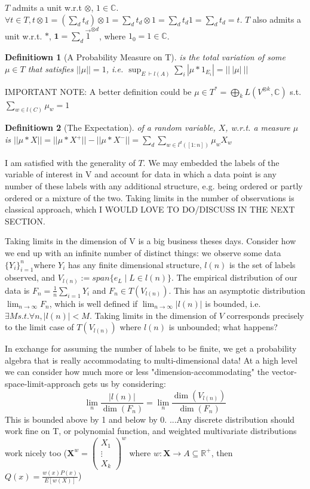 \documentclass{article}
\newtheorem*{definition}{Definitiown}
\begin{document}
$T$ admits a unit w.r.t $\otimes$, $1\in \mathbb{C}$. $\forall t \in T, t\otimes 1 = (\sum_d t_d)\otimes 1 = \sum_d t_d\otimes 1 = \sum_d t_d1 = \sum_d t_d = t$. 
$T$ also admits a unit w.r.t. $*$, $\mathbf{1} = \sum_d \vec{1}^{\otimes d}$, where $1_0 = 1\in\mathbb{C}$.

\begin{definition}[A Probability Measure on T] is the total variation of some $\mu\in T$ that satisfies $||\mu|| = 1 $, i.e. $\sup_{E\: \vdash l(A)} \sum_i |\mu * 1_{E_i}| =||\:|\mu|\: ||$ \end{definition} 

IMPORTANT NOTE: A better definition could be $\mu\in T^* = \bigoplus_k L(V^{\otimes k},\mathbb{C}) $ s.t. $\sum_{w\in l(C)}\mu_w = 1$

\begin{definition}[The Expectation] of a random variable, $X$, w.r.t. a measure $\mu$ is $  ||\mu *X ||= ||\mu* X^+||- ||\mu* X^-|| = \sum_d \sum_{w\in l^d([1:n])} \mu_w X_w$  \end{definition}

I am satisfied with the generality of $T$. We may embedded the labels of the variable of interest in V and account for data in which a data point is any number of these labels with any additional structure, e.g. being ordered or partly ordered or a mixture of the two. Taking limits in the number of observations is classical approach, which I WOULD LOVE TO DO/DISCUSS IN THE NEXT SECTION. 

Taking limits in the dimension of V is a big business theses days. Consider how we end up with an infinite number of distinct things: we observe some data $\{Y_i\}^n_{i=1}$where $Y_i$ has any finite dimensional structure, $l(n)$ is the set of labels observed, and $V_{l(n)} := span\{e_L\mid L \in l(n)\}$. The empirical distribution of our data is $ F_n = \frac{1}{n}\sum_{i=1} Y_i$ and $F_n \in T(V_{l(n)})$. This has an asymptotic distribution $\lim_{n\rightarrow \infty} F_n$, which is well defined if $\lim_{n\rightarrow\infty} |l(n)|$ is bounded, i.e. $\exists M s.t. \forall n, |l(n)| < M$. Taking limits in the dimension of $V$ corresponds precisely to the limit case of $T(V_{l(n)})$ where $l(n)$ is unbounded; what happens?

In exchange for assuming the number of labels to be finite, we get a probability algebra that is really accommodating to multi-dimensional data! At a high level we can consider how much more or less "dimension-accommodating" the vector-space-limit-approach gets us by considering:
\[ \lim_n \frac{|l(n)|}{\dim(F_n)} = \lim_n \frac{ \dim(V_{l(n)})}{\dim(F_n)} \]This is bounded above by 1 and below by 0.
...Any discrete distribution should work fine on T,
or polynomial function,
and weighted multivariate distributions work nicely too 
($\mathbf{X}^w = \begin{pmatrix} X_1 \\ \vdots \\ X_k\end{pmatrix}^w$ where $w:\mathbf{X}\rightarrow A\subseteq\mathbb{R}^+$, then $Q(x)=\frac{w(x)P(x)}{E[w(X)]}$)
\end{document}
